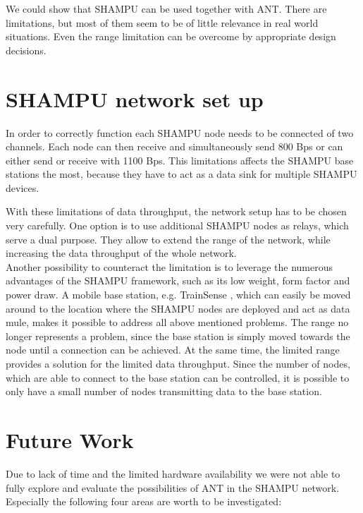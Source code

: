 We could show that SHAMPU can be used together with ANT. There are limitations, but most of them seem to be of little relevance in real world situations. Even the range limitation can be overcome by appropriate design decisions.

\section{SHAMPU network set up}
In order to correctly function each SHAMPU node needs to be connected of two channels. Each node can then receive and simultaneously send 800 Bps or can either send or receive with 1100 Bps. This limitations affects the SHAMPU base stations the most, because they have to act as a data sink for multiple SHAMPU devices.

With these limitations of data throughput, the network setup has to be chosen very carefully. One option is to use additional SHAMPU nodes as relays, which serve a dual purpose. They allow to extend the range of the network, while increasing the data throughput of the whole network.\\ Another possibility to counteract the limitation is to leverage the numerous advantages of the SHAMPU framework, such as its low weight, form factor and power draw. A mobile base station, e.g. TrainSense \cite{smeets2013trainsense}, which can easily be moved around to the location where the SHAMPU nodes are deployed and act as data mule, makes it possible to address all above mentioned problems. The range no longer represents a problem, since the base station is simply moved towards the node until a connection can be achieved. At the same time, the limited range provides a solution for the limited data throughput. Since the number of nodes, which are able to connect to the base station can be controlled, it is possible to only have a small number of nodes transmitting data to the base station.


\newpage
\section{Future Work}
\label{sec:future}
Due to lack of time and the limited hardware availability we were not able to fully explore and evaluate the possibilities of ANT in the SHAMPU network. Especially the following four areas are worth to be investigated:

